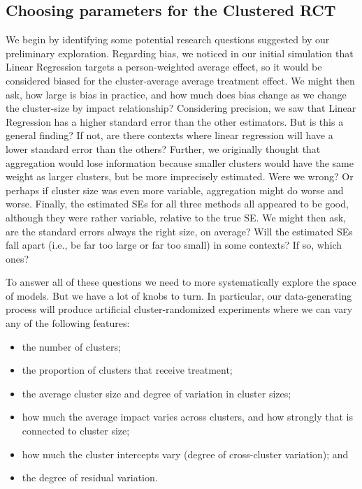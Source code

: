 \documentclass[
]{book}
\providecommand{\tightlist}{%
  \setlength{\itemsep}{0pt}\setlength{\parskip}{0pt}}
\begin{document}
\subsection{Choosing parameters for the Clustered RCT}\label{choosing-parameters-for-the-clustered-rct}

We begin by identifying some potential research questions suggested by our preliminary exploration.
Regarding bias, we noticed in our initial simulation that Linear Regression targets a person-weighted average effect, so it would be considered biased for the cluster-average average treatment effect.
We might then ask, how large is bias in practice, and how much does bias change as we change the cluster-size by impact relationship?
Considering precision, we saw that Linear Regression has a higher standard error than the other estimators.
But is this a general finding? If not, are there contexts where linear regression will have a lower standard error than the others?
Further, we originally thought that aggregation would lose information because smaller clusters would have the same weight as larger clusters, but be more imprecisely estimated.
Were we wrong? Or perhaps if cluster size was even more variable, aggregation might do worse and worse.
Finally, the estimated SEs for all three methods all appeared to be good, although they were rather variable, relative to the true SE.
We might then ask, are the standard errors always the right size, on average? Will the estimated SEs fall apart (i.e., be far too large or far too small) in some contexts? If so, which ones?

To answer all of these questions we need to more systematically explore the space of models.
But we have a lot of knobs to turn.
In particular, our data-generating process will produce artificial cluster-randomized experiments where we can vary any of the following features:

\begin{itemize}
\tightlist
\item
  the number of clusters;
\item
  the proportion of clusters that receive treatment;
\item
  the average cluster size and degree of variation in cluster sizes;
\item
  how much the average impact varies across clusters, and how strongly that is connected to cluster size;
\item
  how much the cluster intercepts vary (degree of cross-cluster variation); and
\item
  the degree of residual variation.
\end{itemize}
\end{document}
